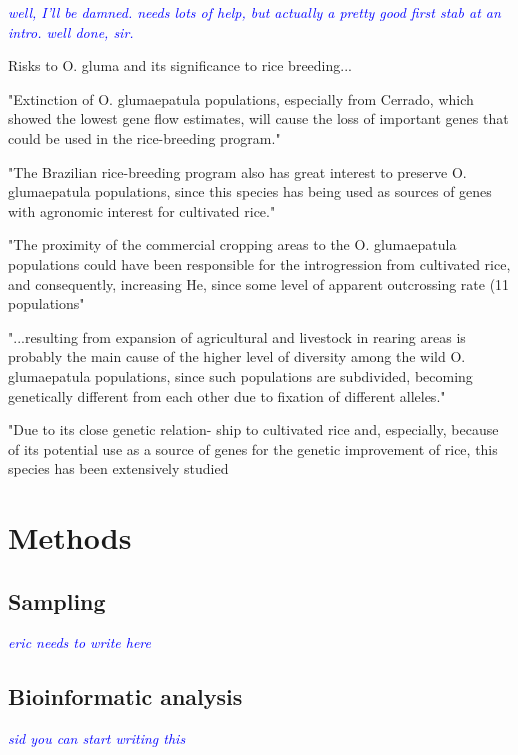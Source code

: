 \documentclass[11pt]{article} %
\newcommand{\jri}[1]{\textcolor{blue}{ \emph{\scriptsize  #1}} } %
\begin{document}
\begin{linenumbers}
\jri{well, I'll be damned. needs lots of help, but actually a pretty good first stab at an intro. well done, sir.}


Risks to O. gluma and its significance to rice breeding...

"Extinction of O. glumaepatula populations, especially from Cerrado,
which showed the lowest gene flow estimates, will cause the loss of 
important genes that could be used in the rice-breeding program."
\cite{brondani2005}

"The Brazilian rice-breeding
program also has great interest to preserve
O. glumaepatula populations, since this species has
being used as sources of genes with agronomic
interest for cultivated rice."
\cite{brondani2005}

"The proximity of the
commercial cropping areas to the O. glumaepatula
populations could have been responsible for the
introgression from cultivated rice, and consequently,
increasing He, since some level of apparent
outcrossing rate (11%
populations"
\cite{brondani2005}

"...resulting from expansion of agricultural
and livestock in rearing areas is probably the
main cause of the higher level of diversity among
the wild O. glumaepatula populations, since such
populations are subdivided, becoming genetically
different from each other due to fixation of different
alleles."
\cite{brondani2005}

"Due to its close genetic relation-
ship to cultivated rice and, especially, because of its
potential use as a source of genes for the genetic
improvement of rice, this species has been extensively
studied 
\cite{SánchezandEspinoza2003}

\section*{Methods}
\subsection*{Sampling}
\jri{eric needs to write here}
\subsection*{Bioinformatic analysis}
\jri{sid you can start writing this}

\clearpage



\end{linenumbers}
\end{document}
